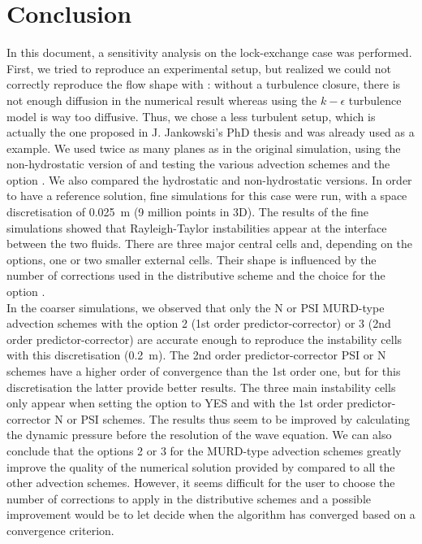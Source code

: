 \section{Conclusion}
%
In this document, a sensitivity analysis on the lock-exchange case was performed.
First, we tried to reproduce an experimental setup, but realized we could not
correctly reproduce the flow shape with : without a turbulence closure,
there is not enough diffusion in the numerical result whereas using the $k-\epsilon$
turbulence model is way too diffusive. Thus, we chose a less turbulent setup, which
is actually the one proposed in J. Jankowski's PhD thesis and was already used
as a  example.
We used twice as many planes as in the original simulation, using the non-hydrostatic
version of  and testing the various advection schemes and the option
.
We also compared the hydrostatic and non-hydrostatic versions.
In order to have a reference solution, fine simulations for this case were run,
with a space discretisation of 0.025~m (9 million points in 3D).
The results of the fine simulations showed that Rayleigh-Taylor instabilities
appear at the interface between the two fluids.
There are three major central cells and, depending on the options, one or two
smaller external cells.
Their shape is influenced by the number of corrections used in the distributive
scheme and the choice for the option .\\

In the coarser simulations, we observed that only the N or PSI MURD-type
advection schemes with the option 2 (1st order predictor-corrector) or 3
(2nd order predictor-corrector)
are accurate enough to reproduce the instability cells with this discretisation (0.2~m).
The 2nd order predictor-corrector PSI or N schemes have a higher order of
convergence than the 1st order one, but for this discretisation the latter
provide better results. The three main instability cells only appear when setting the option
 to YES and with the 1st order
predictor-corrector N or PSI schemes.
The results thus seem to be improved by calculating the dynamic pressure before
the resolution of the wave equation. We can also conclude that the options 2 or
3 for the MURD-type advection schemes greatly improve the quality of the
numerical solution provided by  compared to all the other advection schemes.
However, it seems difficult for the user to choose the number of corrections to
apply in the distributive schemes and a possible improvement
would be to let  decide when the algorithm has converged based
on a convergence criterion. \\

